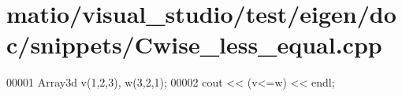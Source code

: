 \hypertarget{matio_2visual__studio_2test_2eigen_2doc_2snippets_2_cwise__less__equal_8cpp_source}{}\section{matio/visual\+\_\+studio/test/eigen/doc/snippets/\+Cwise\+\_\+less\+\_\+equal.cpp}
\label{matio_2visual__studio_2test_2eigen_2doc_2snippets_2_cwise__less__equal_8cpp_source}

\begin{DoxyCode}
00001 Array3d v(1,2,3), w(3,2,1);
00002 cout << (v<=w) << endl;
\end{DoxyCode}
